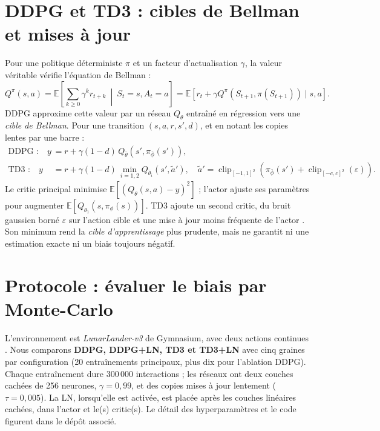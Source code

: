 \documentclass[10pt,a4paper]{article}
\newcommand{\E}{\mathbb{E}}
\newcommand{\Q}{Q^{\pi}}
\begin{document}
\section{DDPG et TD3 : cibles de Bellman et mises à jour}
Pour une politique déterministe $\pi$ et un facteur d'actualisation $\gamma$, la valeur véritable vérifie l'équation de Bellman :
\begin{equation}
\Q(s,a)=\E\!\left[\sum_{k\geq0}\gamma^k r_{t+k}\ \middle|\ S_t=s,A_t=a\right]
=\E\!\left[r_t+\gamma\Q(S_{t+1},\pi(S_{t+1}))\mid s,a\right].
\label{eq:bellman}
\end{equation}
DDPG approxime cette valeur par un réseau $Q_\theta$ entraîné en régression vers une \emph{cible de Bellman}. Pour une transition $(s,a,r,s',d)$, et en notant les copies lentes par une barre :
\begin{align}
\text{DDPG :}\quad y &= r+\gamma(1-d)\,Q_{\bar\theta}(s',\pi_{\bar\phi}(s')),\label{eq:ddpg}\\[-3pt]
\text{TD3 :}\quad y &= r+\gamma(1-d)\,\min_{i=1,2}Q_{\bar\theta_i}(s',\widetilde a'),
\quad \widetilde a'=\operatorname{clip}_{[-1,1]^2}\!\left(\pi_{\bar\phi}(s')+\operatorname{clip}_{[-c,c]^2}(\varepsilon)\right).\label{eq:td3}
\end{align}
Le critic principal minimise $\E[(Q_\theta(s,a)-y)^2]$ ; l'actor ajuste ses paramètres pour augmenter $\E[Q_{\theta_1}(s,\pi_\phi(s))]$. TD3 ajoute un second critic, du bruit gaussien borné $\varepsilon$ sur l'action cible et une mise à jour moins fréquente de l'actor \cite{lillicrap2016,fujimoto2018}. Son minimum rend la \emph{cible d'apprentissage} plus prudente, mais ne garantit ni une estimation exacte ni un biais toujours négatif.

\section{Protocole : évaluer le biais par Monte-Carlo}
L'environnement est \emph{LunarLander-v3} de Gymnasium, avec deux actions continues \cite{towers2024}. Nous comparons \textbf{DDPG, DDPG+LN, TD3 et TD3+LN} avec cinq graines par configuration (20 entraînements principaux, plus dix pour l'ablation DDPG). Chaque entraînement dure 300\,000 interactions ; les réseaux ont deux couches cachées de 256 neurones, $\gamma=0{,}99$, et des copies mises à jour lentement ($\tau=0{,}005$). La LN, lorsqu'elle est activée, est placée après les couches linéaires cachées, dans l'actor et le(s) critic(s). Le détail des hyperparamètres et le code figurent dans le dépôt associé.
\end{document}
